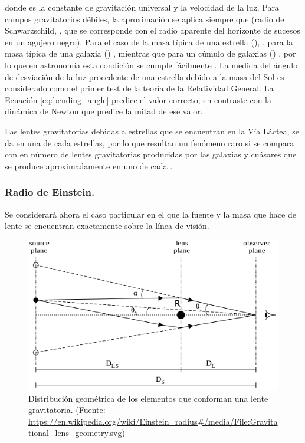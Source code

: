 donde  es la constante de gravitación universal y  la velocidad de la luz. Para campos gravitatorios débiles, la aproximación se aplica siempre que  (radio de Schwarzschild, , que se corresponde con el radio aparente del horizonte de sucesos en un agujero negro). Para el caso de la masa típica de una estrella (), , para la masa típica de una galaxia () , mientras que para un cúmulo de galaxias () , por lo que en astronomía esta condición se cumple fácilmente \citep{book:encyclopedia}.
La medida del ángulo de desviación de la luz procedente de una estrella debido a la masa del Sol es considerado como el primer test de la teoría de la Relatividad General. La Ecuación \ref{eq:bending_angle} predice el valor correcto; en contraste con la dinámica de Newton que predice la mitad de ese valor.

Las lentes gravitatorias debidas a estrellas que se encuentran en la Vía Láctea, se da en una de cada  estrellas, por lo que resultan un fenómeno raro si se compara con en número de lentes gravitatorias producidas por las galaxias y cuásares que se produce aproximadamente en uno de cada  \citep{book:encyclopedia}. 

\subsubsection{Radio de Einstein.}

Se considerará ahora el caso particular en el que la fuente y la masa que hace de lente se encuentran exactamente sobre la línea de visión.

\begin{figure}[htb]
    \begin{center}
         \includegraphics[width=14cm]{1_Introduccion/Gravitational_lens_geometry.png}
    \end{center}
    \caption{\small {Distribución geométrica de los elementos que conforman una lente gravitatoria.} (Fuente: \url{https://en.wikipedia.org/wiki/Einstein_radius\#/media/File:Gravitational_lens_geometry.svg})}
    \label{fig:lente}
\end{figure}

